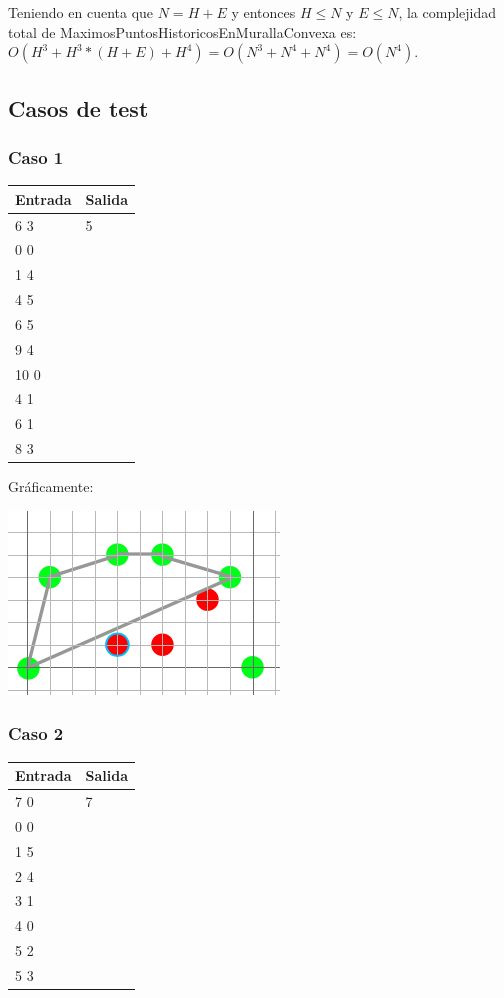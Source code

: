 Teniendo en cuenta que $N = H+E$ y entonces $H \leq N$ y $E \leq N$, la complejidad total de MaximosPuntosHistoricosEnMurallaConvexa
es: $O(H^3+H^3*(H+E)+H^4) = O(N^3+N^4+N^4) = O(N^4)$.

\subsection{Casos de test}

\subsubsection*{Caso 1}

\begin{center}
    \begin{tabular}{| l | l |}
    \hline
    Entrada & Salida \\ \hline
	6 3 & 5 \\
	0 0 & \\
	1 4 & \\
	4 5 & \\
	6 5 & \\
	9 4 & \\
	10 0 & \\
	4 1 & \\
	6 1 & \\
	8 3 & \\
	\hline
    \end{tabular}
\end{center}

Gráficamente:

\includegraphics[scale=0.5]{img/ej3c1.png}

\subsubsection*{Caso 2}

\begin{center}
    \begin{tabular}{| l | l |}
    \hline
    Entrada & Salida \\ \hline
	7 0 & 7 \\
	0 0 & \\
	1 5 & \\
	2 4 & \\
	3 1 & \\
	4 0 & \\
	5 2 & \\
	5 3 & \\
	\hline
    \end{tabular}
\end{center}

